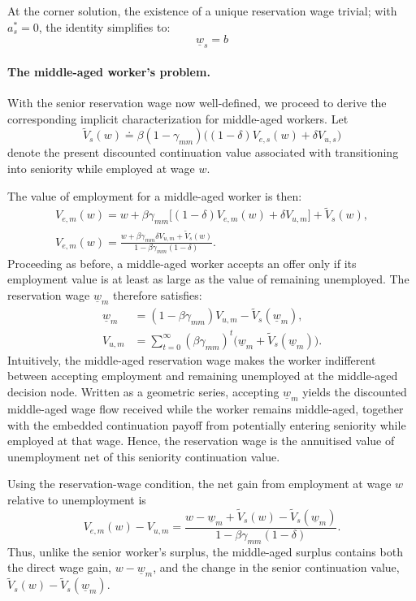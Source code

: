 \documentclass{article}
\newcommand{\lbar}[1]{\underline{#1}} %
\begin{document}
At the corner solution, the existence of a unique reservation wage trivial; with $a^*_s=0$, the identity simplifies to:
\[
\lbar{w}_s=b
\]

\paragraph{The middle-aged worker's problem.}

With the senior reservation wage now well-defined, we proceed to derive the corresponding implicit characterization for middle-aged workers. Let
\[
\tilde{V}_s(w)
\doteq
\beta(1-\gamma_{mm})
\bigl((1-\delta)V_{e,s}(w)+\delta V_{u,s}\bigr)
\]
denote the present discounted continuation value associated with transitioning into seniority while employed at wage $w$.

The value of employment for a middle-aged worker is then:
\begin{gather*}
V_{e,m}(w)
=
w
+
\beta\gamma_{mm}
\bigl[(1-\delta)V_{e,m}(w)+\delta V_{u,m}\bigr]
+
\tilde{V}_s(w),
\\
V_{e,m}(w)
=
\frac{
w+\beta\gamma_{mm}\delta V_{u,m}+\tilde{V}_s(w)
}{
1-\beta\gamma_{mm}(1-\delta)
}.
\end{gather*}
Proceeding as before, a middle-aged worker accepts an offer only if its employment value is at least as large as the value of remaining unemployed. The reservation wage $\lbar{w}_m$ therefore satisfies:
\begin{align*}
\lbar{w}_m
&=
(1-\beta\gamma_{mm})V_{u,m}
-
\tilde{V}_s(\lbar{w}_m),
\\
V_{u,m}
&=
\sum_{t=0}^{\infty}
(\beta\gamma_{mm})^t
\bigl(\lbar{w}_m+\tilde{V}_s(\lbar{w}_m)\bigr).
\end{align*}
Intuitively, the middle-aged reservation wage makes the worker indifferent between accepting employment and remaining unemployed at the middle-aged decision node. Written as a geometric series, accepting $\lbar{w}_m$ yields the discounted middle-aged wage flow received while the worker remains middle-aged, together with the embedded continuation payoff from potentially entering seniority while employed at that wage. Hence, the reservation wage is the annuitised value of unemployment net of this seniority continuation value.

Using the reservation-wage condition, the net gain from employment at wage $w$ relative to unemployment is
\[
V_{e,m}(w)-V_{u,m}
=
\frac{
w-\lbar{w}_m+\tilde V_s(w)-\tilde V_s(\lbar{w}_m)
}
{1-\beta\gamma_{mm}(1-\delta)}.
\]
Thus, unlike the senior worker's surplus, the middle-aged surplus contains both the direct wage gain, $w-\lbar{w}_m$, and the change in the senior continuation value, $\tilde V_s(w)-\tilde V_s(\lbar{w}_m)$.
\end{document}
